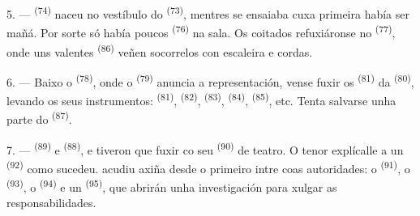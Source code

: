 \VUsaut{5.0mm}
\VUsaut{3.4mm}

5. ---  \textsuperscript{(74)} naceu no vestíbulo do
 \textsuperscript{(73)}, mentres se ensaiaba  cuxa
primeira  había ser mañá. Por sorte só había poucos
 \textsuperscript{(76)} na sala. Os coitados refuxiáronse no
 \textsuperscript{(77)}, onde uns valentes 
\textsuperscript{(86)} veñen socorrelos con escaleira e cordas.

6. --- Baixo o  \textsuperscript{(78)}, onde o 
\textsuperscript{(79)} anuncia a representación, vense fuxir os 
\textsuperscript{(81)} da  \textsuperscript{(80)}, levando os seus
instrumentos:  \textsuperscript{(81)}, 
\textsuperscript{(82)},  \textsuperscript{(83)},
 \textsuperscript{(84)},  \textsuperscript{(85)}, etc.
Tenta salvarse unha parte do  \textsuperscript{(87)}.

7. ---  \textsuperscript{(89)} e 
\textsuperscript{(88)},  e  tiveron que fuxir
co seu  \textsuperscript{(90)} de teatro. O tenor explícalle a un
 \textsuperscript{(92)} como sucedeu. 
acudiu axiña desde o primeiro intre coas autoridades: o 
\textsuperscript{(91)}, o  \textsuperscript{(93)}, o
 \textsuperscript{(94)} e un 
\textsuperscript{(95)}, que abrirán unha investigación para xulgar as
responsabilidades.
